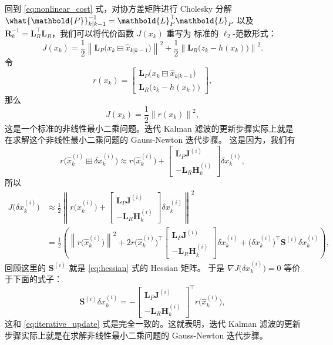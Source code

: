 \documentclass[fontset=none,zihao=-4]{Notes}
\newcommand{\norm}[1]{\left\lVert#1\right\rVert}
\newcommand{\mat}[1]{\mathbold{#1}}
\begin{document}
回到 \eqref{eq:nonlinear_cost} 式，对协方差矩阵进行 Cholesky 分解 $\what{\mat P}_{k|k-1}^{-1}=\mat L_P^\top\mat L_P$
以及 $\mat R_k^{-1}=\mat L_R^\top\mat L_R$，我们可以将代价函数 $J(x_k)$ 重写为
标准的 $\ell_2$-范数形式：
\[
  J(x_k)=\frac{1}{2}
  \norm{
    \mat L_P\bigl(x_k\boxminus \hat x_{k|k-1}\bigr)
  }^2+\frac{1}{2}\norm{
    \mat L_R\bigl(z_k-h(x_k)\bigr)
  }^2.
\]
令
\[
  r(x_k)=\begin{bmatrix}
    \mat L_P\bigl(x_k\boxminus \hat x_{k|k-1}\bigr)\\
    \mat L_R\bigl(z_k-h(x_k)\bigr)
  \end{bmatrix},
\]
那么
\[
  J(x_k)=\frac{1}{2}\norm{r(x_k)}^2,
\]
这是一个标准的非线性最小二乘问题。迭代 Kalman 滤波的更新步骤实际上就是在求解这个非线性最小二乘问题的 Gauss-Newton 迭代步骤。
这是因为，我们有
\[
  r\bigl(\hat x_k^{(i)}\boxplus \delta x_k^{(i)}\bigr)\approx 
  r\bigl(\hat x_k^{(i)}\bigr)+\begin{bmatrix}
    \mat L_P\mat J^{(i)} \\
    -\mat L_R\mat H_k^{(i)}
  \end{bmatrix}\delta x_k^{(i)},
\]
所以
\begin{align*}
  J\bigl(\delta x_k^{(i)}\bigr)&\approx \frac{1}{2}\norm{
    r\bigl(\hat x_k^{(i)}\bigr)+\begin{bmatrix}
    \mat L_P\mat J^{(i)} \\
    -\mat L_R\mat H_k^{(i)}
  \end{bmatrix}\delta x_k^{(i)}
  }^2\\
  &=\frac{1}{2}\left(
    \norm{r\bigl(\hat x_k^{(i)}\bigr)}^2+2
    r\bigl(\hat x_k^{(i)}\bigr)^\top\begin{bmatrix}
    \mat L_P\mat J^{(i)} \\
    -\mat L_R\mat H_k^{(i)}
  \end{bmatrix}\delta x_k^{(i)}+
  \bigl(\delta x_k^{(i)}\bigr)^\top 
  \mat S^{(i)}
  \delta x_k^{(i)}
  \right),
\end{align*}
回顾这里的 $\mat S^{(i)}$ 就是 \eqref{eq:hessian} 式的 Hessian 矩阵。
于是 $\nabla J\bigl(\delta x_k^{(i)}\bigr)=0$ 等价于下面的式子：
\begin{equation}
  \mat S^{(i)}\delta x_k^{(i)}=-\begin{bmatrix}
    \mat L_P\mat J^{(i)} \\
    -\mat L_R\mat H_k^{(i)}
  \end{bmatrix}^\top r\bigl(\hat x_k^{(i)}\bigr),
\end{equation}
这和 \eqref{eq:iterative_update} 式是完全一致的。这就表明，迭代 Kalman 滤波的更新步骤实际上就是在求解非线性最小二乘问题的 Gauss-Newton 迭代步骤。
\end{document}

